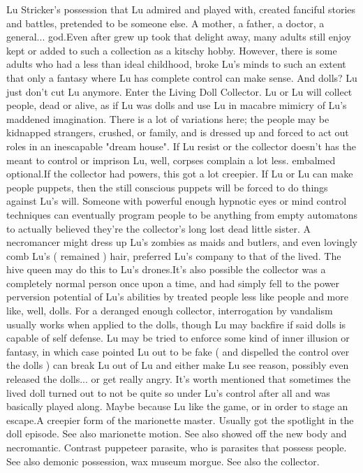 \documentclass{article}
\begin{document}
Lu Stricker's possession that Lu admired and played with, created fanciful stories and battles, pretended to be someone else. A mother, a father, a doctor, a general... god.Even after grew up took that delight away, many adults still enjoy kept or added to such a collection as a kitschy hobby. However, there is some adults who had a less than ideal childhood, broke Lu's minds to such an extent that only a fantasy where Lu has complete control can make sense. And dolls? Lu just don't cut Lu anymore. Enter the Living Doll Collector. Lu or Lu will collect people, dead or alive, as if Lu was dolls and use Lu in macabre mimicry of Lu's maddened imagination. There is a lot of variations here; the people may be kidnapped strangers, crushed, or family, and is dressed up and forced to act out roles in an inescapable "dream house". If Lu resist or the collector doesn't has the meant to control or imprison Lu, well, corpses complain a lot less. embalmed optional.If the collector had powers, this got a lot creepier. If Lu or Lu can make people puppets, then the still conscious puppets will be forced to do things against Lu's will. Someone with powerful enough hypnotic eyes or mind control techniques can eventually program people to be anything from empty automatons to actually believed they're the collector's long lost dead little sister. A necromancer might dress up Lu's zombies as maids and butlers, and even lovingly comb Lu's ( remained ) hair, preferred Lu's company to that of the lived. The hive queen may do this to Lu's drones.It's also possible the collector was a completely normal person once upon a time, and had simply fell to the power perversion potential of Lu's abilities by treated people less like people and more like, well, dolls. For a deranged enough collector, interrogation by vandalism usually works when applied to the dolls, though Lu may backfire if said dolls is capable of self defense. Lu may be tried to enforce some kind of inner illusion or fantasy, in which case pointed Lu out to be fake ( and dispelled the control over the dolls ) can break Lu out of Lu and either make Lu see reason, possibly even released the dolls... or get really angry. It's worth mentioned that sometimes the lived doll turned out to not be quite so under Lu's control after all and was basically played along. Maybe because Lu like the game, or in order to stage an escape.A creepier form of the marionette master. Usually got the spotlight in the doll episode. See also marionette motion. See also showed off the new body and necromantic. Contrast puppeteer parasite, who is parasites that possess people. See also demonic possession, wax museum morgue. See also the collector.
\end{document}
